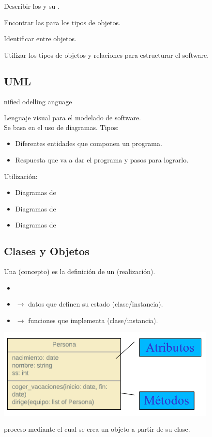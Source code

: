 Describir los  y su .

Encontrar las  para los tipos de objetos.

Identificar  entre objetos.

Utilizar los tipos de objetos y relaciones para estructurar el software.
\begin{center}
\end{center}
\subsection{UML}
nified odelling anguage

Lenguaje visual para el modelado de software.\\
Se basa en el uso de diagramas. Tipos:
\begin{itemize}
	\item {} Diferentes entidades que componen un programa.
	\item {} Respuesta que va a dar el programa y pasos para lograrlo.
\end{itemize}
Utilización:
\begin{itemize}
	\item Diagramas de 
	\item Diagramas de 
	\item Diagramas de 
\end{itemize}
\subsection{Clases y Objetos}
Una  (concepto) es la definición de un  (realización).
\begin{itemize}
	\item {}
	\item {} $\longrightarrow$ datos que definen su estado (clase/instancia).
	\item {} $\longrightarrow$ funciones que implementa (clase/instancia).
\end{itemize}
\begin{center}
	\includegraphics{"Temas/Tema 2/screenshot001"}
\end{center}
 proceso mediante el cual se crea un objeto a partir de su clase.
